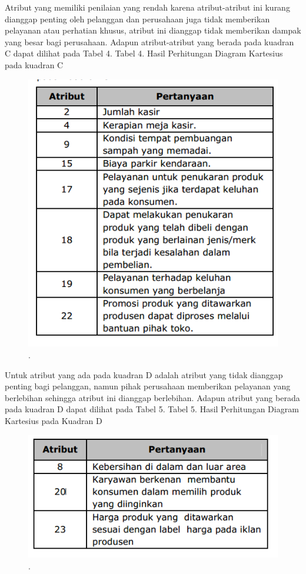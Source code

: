 Atribut yang memiliki penilaian yang rendah karena atribut-atribut ini kurang dianggap penting oleh pelanggan dan perusahaan juga tidak memberikan pelayanan atau perhatian khusus, 
atribut ini dianggap tidak memberikan dampak yang besar bagi perusahaan.
Adapun atribut-atribut yang berada pada kuadran C dapat dilihat pada Tabel 4.
Tabel 4. Hasil Perhitungan Diagram Kartesius pada kuadran C
\begin{figure}[ht]
	\centerline{\includegraphics[width=1\textwidth]{figures/rahmi7.PNG}}
	\caption{.}
	\label{rahmi7}
	\end{figure}

Untuk atribut yang ada pada kuadran D adalah atribut yang tidak dianggap penting bagi pelanggan, namun pihak perusahaan memberikan pelayanan yang berlebihan 
sehingga atribut ini dianggap berlebihan.
Adapun atribut yang berada pada kuadran D dapat dilihat pada Tabel 5.
Tabel 5. Hasil Perhitungan Diagram Kartesius
pada Kuadran D	
\begin{figure}[ht]
	\centerline{\includegraphics[width=1\textwidth]{figures/rahmi8.PNG}}
	\caption{.}
	\label{rahmi8}
	\end{figure}


